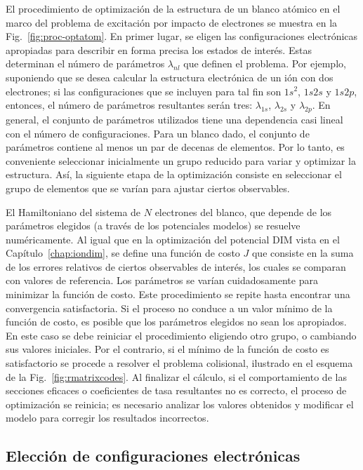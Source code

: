 El procedimiento de optimización de la estructura de un blanco atómico
en el marco del problema de excitación por impacto de electrones se 
muestra en la Fig.~\ref{fig:proc-optatom}. En primer lugar, se eligen 
las configuraciones electrónicas apropiadas para describir en forma 
precisa los estados de interés. Estas determinan el número de parámetros 
$\lambda_{nl}$ que definen el problema. Por ejemplo, suponiendo que se 
desea calcular la estructura electrónica de un ión con dos electrones; 
si las configuraciones que se incluyen para tal fin son $1s^2$, $1s2s$ y 
$1s2p$, entonces, el número de parámetros resultantes serán tres: 
$\lambda_{1s}$, $\lambda_{2s}$ y $\lambda_{2p}$. En general, el conjunto
de parámetros utilizados tiene una dependencia casi lineal 
con el número de configuraciones. Para un blanco dado, el conjunto de 
parámetros contiene al menos un par de decenas de elementos. Por lo 
tanto, es conveniente seleccionar inicialmente un grupo reducido para 
variar y optimizar la estructura. Así, la siguiente etapa de la 
optimización consiste en seleccionar el grupo de elementos que se varían
para ajustar ciertos observables. 

El Hamiltoniano del sistema de $N$ electrones del blanco, que depende de 
los parámetros elegidos (a través de los potenciales modelos) se 
resuelve numéricamente. Al igual que en la optimización del potencial 
DIM vista en el Capítulo~\ref{chap:iondim}, se define una función de 
costo $J$ que consiste en la suma de los errores relativos de ciertos 
observables de interés, los cuales se comparan con valores de referencia. 
Los parámetros se varían cuidadosamente para minimizar la función de 
costo. Este procedimiento se repite hasta encontrar una convergencia 
satisfactoria. Si el proceso no conduce a un valor mínimo de la función 
de costo, es posible  que los parámetros elegidos no sean los apropiados. 
En este caso se debe reiniciar el procedimiento eligiendo otro grupo, o 
cambiando sus valores iniciales.
Por el contrario, si el mínimo de la función de costo es satisfactorio 
se procede a resolver el problema colisional, ilustrado en el esquema de
la Fig.~\ref{fig:rmatrixcodes}. Al finalizar el cálculo, si el 
comportamiento de las secciones eficaces o coeficientes de tasa 
resultantes no es correcto, el proceso de optimización se reinicia; es 
necesario analizar los valores obtenidos y modificar el modelo para 
corregir los resultados incorrectos. 

\subsection{Elección de configuraciones electrónicas}

